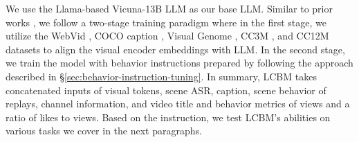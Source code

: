 We use the Llama-based Vicuna-13B LLM \citep{touvron2023llama,vicuna2023} as our base LLM. Similar to prior works \citep{liu2023visual,ge2023planting,li2023blip2,zhu2023minigpt}, we follow a two-stage training paradigm where in the first stage, we utilize the WebVid \citep{bain2021frozen}, COCO caption \citep{chen2015microsoft}, Visual Genome \citep{krishna2017dense}, CC3M \citep{sharma2018conceptual}, and CC12M \citep{changpinyo2021conceptual} datasets to align the visual encoder embeddings with LLM. In the second stage, we train the model with behavior instructions prepared by following the approach described in \S\ref{sec:behavior-instruction-tuning}. In summary, LCBM takes concatenated inputs of visual tokens, scene ASR, caption, scene behavior of replays, channel information, and video title and behavior metrics of views and a ratio of likes to views. Based on the instruction, we test LCBM's abilities on various tasks we cover in the next paragraphs.




